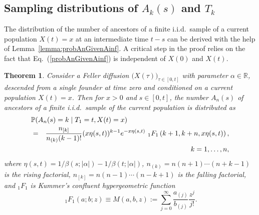 \documentclass[preprint,12pt]{elsarticle}
\newtheorem{theorem}{Theorem}
\begin{document}
%
%
\subsection{Sampling distributions of $A_k(s)$ and $T_k$}
\label{sec:SamplingDistributions}

The distribution of the number of ancestors of a finite i.i.d.\ sample of a current population $X(t) = x$ at an intermediate time $t - s$ can be 
derived with the help of Lemma~\ref{lemma:probAnGivenAinf}.  A critical step in the proof relies on the fact that 
Eq.~(\ref{probAnGivenAinf}) is independent of $X(0)$ and $X(t)$.  
\begin{theorem}	\label{theorem:AnSample}
Consider a Feller diffusion $\big(X(\tau)\big)_{\tau \in [0, t]}$ with parameter $\alpha \in \mathbb{R}$, 
descended from a single founder at time zero and conditioned on a current population $X(t) = x$. 
Then for $x > 0$ and $s \in [0, t]$, the number $A_n(s)$ of ancestors of a finite i.i.d.\ sample of the current population is distributed as 
\begin{eqnarray*}	%
\lefteqn{\mathbb{P}(A_n(s) = k \mid T_1 = t, X(t) = x)} \nonumber \\ 
	& = & \frac{n_{[k]}}{n_{(k)} (k - 1)!}(x\eta(s, t))^{k - 1} e^{-x\eta(s, t)}~_1F_1\left(k + 1, k + n, x\eta(s, t)\right),  \nonumber \\
	& & \qquad\qquad\qquad\qquad\qquad\qquad k = 1, \ldots, n,
\end{eqnarray*}
where $ \eta(s, t) = 1/\beta(s; |\alpha|)-1/\beta(t; |\alpha|)$, $n_{(k)} = n(n + 1)\cdots(n + k - 1)$ is the rising factorial, $n_{[k]} = n(n - 1)\cdots(n - k +1)$ is the falling factorial, 
and $_1F_1$ is Kummer's confluent hypergeometric function~\citep[Eq.~(13.1.2)]{Abramowitz:1965sf} 
\[
~_1F_1(a; b; z) \equiv M(a,b,z) :=\sum_{j=0}^\infty\frac{a_{(j)}}{b_{(j)}}\frac{z^j}{j!}.
\]
\end{theorem}
%
\end{document}
